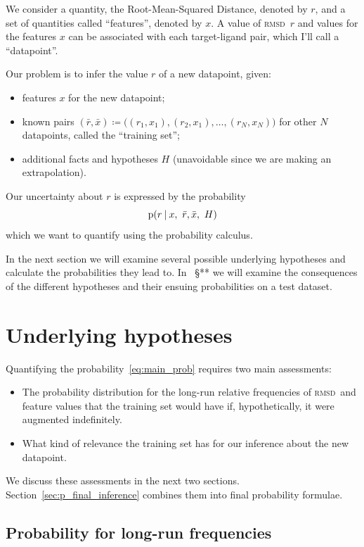 \documentclass[\ifafour a4paper,12pt,\else a5paper,10pt,\fi%
onecolumn,oneside,article,%
british%
]{memoir}
\theoremstyle{remark}
\theoremstyle{innote}
\newcommand*{\defd}{\coloneqq}
\newcommand*{\p}{\mathrm{p}}%
\renewcommand*{\|}[1][]{\nonscript\:#1\vert\nonscript\:\mathopen{}}
\renewcommand*{\=}{\TextOrMath\texteq\eq}
\newcommand*{\sect}{\S}%
\newcommand*{\wrench}{{\fontencoding{U}\fontfamily{fontawesomethree}\selectfont\symbol{114}}}
\newcommand{\mynote}[1]{ {\color{notecolour}#1}}
\newcommand*{\rmsd}{\textsc{rmsd}}
\newcommand*{\ro}{r}
\newcommand*{\xo}{x}
\newcommand*{\rd}{\bar{r}}
\newcommand*{\xd}{\bar{x}}
\begin{document}
We consider a quantity, the Root-Mean-Squared Distance, denoted by $r$, and
a set of quantities called \enquote{features}, denoted by $x$. A
value of \rmsd\ $r$
and values for the  features $x$ can be associated with each target-ligand
pair, which I'll call a \enquote{datapoint}.

Our problem is to infer the value $\ro$ of a new datapoint, given:
\begin{itemize}
\item features $\xo$ for the new datapoint;
\item known pairs
  $(\rd,\xd) \defd \bigl((r_{1}, x_{1}), (r_{2}, x_{1}), \dotsc, (r_{N},
  x_{N})\bigr)$ for other $N$ datapoints, called the \enquote{training
    set};
\item additional facts and hypotheses $H$ (unavoidable since we are making an
extrapolation).
\end{itemize}

Our uncertainty about $\ro$ is expressed by the probability
\begin{equation}
  \label{eq:main_prob}
  \p(\ro \| \xo,\ \rd,\xd,\ H) 
\end{equation}
which we want to quantify using the probability calculus.

In the next section we will examine several possible underlying hypotheses
and calculate the probabilities they lead to. In \mynote{\wrench\ \sect***}
we will examine the consequences of the different hypotheses and their
ensuing probabilities on a test dataset.


\section{Underlying hypotheses}
\label{sec:hypotheses}

Quantifying the probability~\eqref{eq:main_prob} requires two main
assessments:
\begin{itemize}
\item The probability distribution for the long-run relative frequencies of
  \rmsd\ and feature values that the training set would have if,
  hypothetically, it were augmented indefinitely.
\item What kind of relevance the training set has for our inference about
  the new datapoint.
\end{itemize}
We discuss these assessments in the next two sections.
Section~\ref{sec:p_final_inference} combines them into final probability
formulae.


\subsection{Probability for long-run frequencies}
\label{sec:prob_longrun}
\end{document}
